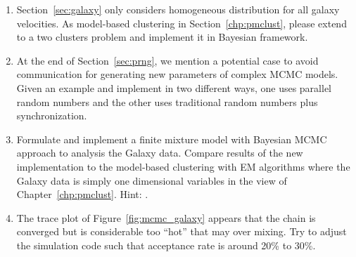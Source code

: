 \begin{enumerate}[label=\thechapter-\arabic*]
\item
Section~\ref{sec:galaxy} only considers homogeneous distribution for all
galaxy velocities. As model-based clustering in Section~\ref{chp:pmclust},
please extend to a two clusters problem and implement it in Bayesian
framework.

\item
At the end of Section~\ref{sec:prng}, we mention a potential case to avoid
communication for generating new parameters of complex MCMC models.
Given an example and implement in two different ways, one uses parallel
random numbers and the other uses traditional random numbers plus
synchronization.

\item
Formulate and implement a finite mixture model with Bayesian MCMC approach
to analysis the Galaxy data. Compare results of the new implementation to the
model-based clustering with EM algorithms where the Galaxy data is simply
one dimensional variables in the view of Chapter~\ref{chp:pmclust}.
{\color{blue} Hint: \citet{Marin2007}.}

\item
The trace plot of Figure~\ref{fig:mcmc_galaxy} appears that the chain is
converged but is considerable too ``hot'' that may over mixing. Try to
adjust the simulation code such that acceptance rate is around 20\% to
30\%.

\end{enumerate}

